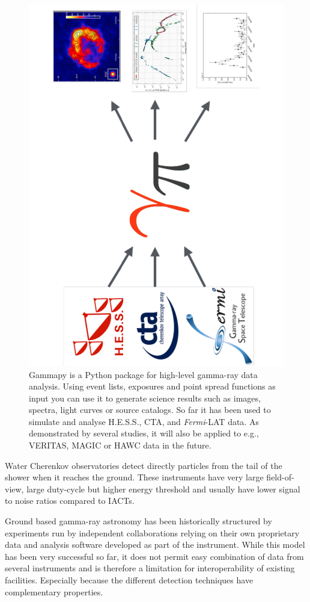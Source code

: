 \begin{figure}[t]
	\centering
	\includegraphics[height=\textwidth, angle=270]{static/gammapy-big-picture}
    \caption{ Gammapy is a Python package
		for high-level gamma-ray data analysis. Using event lists, exposures and point
		spread functions as input you can use it to generate science results such as
		images, spectra, light curves or source catalogs. So far it has been used to
		simulate and analyse H.E.S.S., CTA,  and \textit{Fermi}-LAT data. As demonstrated
		by several studies, it will also be applied to e.g., VERITAS, MAGIC or HAWC data
		in the future. }
	\label{fig:big-picture}

\end{figure}

Water Cherenkov observatories detect directly particles from the tail of the
shower when it reaches the ground. These instruments have very
large field-of-view, large duty-cycle but higher energy threshold and
usually have lower signal to noise ratios compared to IACTs.

Ground based gamma-ray astronomy has been historically structured
by experiments run by independent collaborations relying
on their own proprietary data and analysis software developed as part of the
instrument. While this model has been very successful so far, it does not
permit easy combination of data from several instruments and is therefore
a limitation for interoperability of existing facilities. Especially
because the different detection techniques have complementary
properties.

